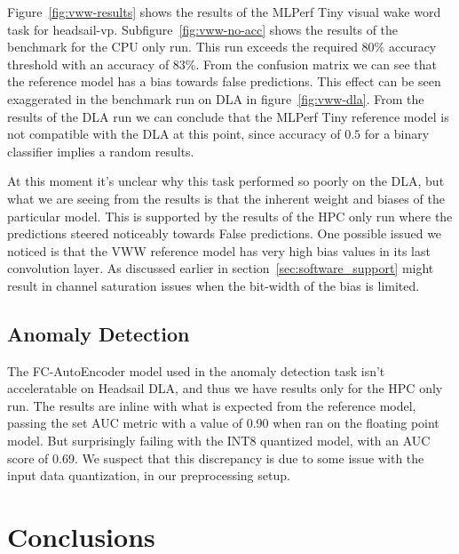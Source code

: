 \documentclass[12pt,a4paper,english
]{tunithesis}
\begin{document}
Figure~\ref{fig:vww-results} shows the results of the MLPerf Tiny visual wake word task for headsail-vp. Subfigure~\ref{fig:vww-no-acc} shows the results of the benchmark for the CPU only run. This run exceeds the required $80\%$ accuracy threshold with an accuracy of $83\%$. From the confusion matrix we can see that the reference model has a bias towards false predictions. This effect can be seen exaggerated in the benchmark run on DLA in figure~\ref{fig:vww-dla}. From the results of the DLA run we can conclude that the MLPerf Tiny reference model is not compatible with the DLA at this point, since accuracy of $0.5$ for a binary classifier implies a random results.

At this moment it's unclear why this task performed so poorly on the DLA, but what we are seeing from the results is that the inherent weight and biases of the particular model. This is supported by the results of the HPC only run where the predictions steered noticeably towards False predictions. One possible issued we noticed is that the VWW reference model has very high bias values in its last convolution layer. As discussed earlier in section~\ref{sec:software_support} might result in channel saturation issues when the bit-width of the bias is limited.

\section{Anomaly Detection}
The FC-AutoEncoder model used in the anomaly detection task isn't acceleratable on Headsail DLA, and thus we have results only for the HPC only run. The results are inline with what is expected from the reference model, passing the set AUC metric with a value of 0.90 when ran on the floating point model. But surprisingly failing with the INT8 quantized model, with an AUC score of 0.69. We suspect that this discrepancy is due to some issue with the input data quantization, in our preprocessing setup.

\chapter{Conclusions}
\label{ch:conclusions}
\end{document}
